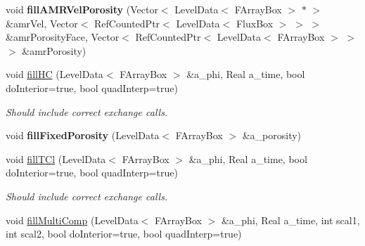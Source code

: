 \begin{DoxyCompactItemize}
\item 
\hypertarget{class_a_m_r_level_mushy_layer_a36ec8a3c5ba9f94da4d1fe0e1e7463cb}{void {\bfseries fill\-A\-M\-R\-Vel\-Porosity} (Vector$<$ Level\-Data$<$ F\-Array\-Box $>$ $\ast$ $>$ \&amr\-Vel, Vector$<$ Ref\-Counted\-Ptr$<$ Level\-Data$<$ Flux\-Box $>$ $>$ $>$ \&amr\-Porosity\-Face, Vector$<$ Ref\-Counted\-Ptr$<$ Level\-Data$<$ F\-Array\-Box $>$ $>$ $>$ \&amr\-Porosity)}\label{class_a_m_r_level_mushy_layer_a36ec8a3c5ba9f94da4d1fe0e1e7463cb}

\item 
\hypertarget{class_a_m_r_level_mushy_layer_aeb42507e6f3613a4ea88070e858b0f48}{void \hyperlink{class_a_m_r_level_mushy_layer_aeb42507e6f3613a4ea88070e858b0f48}{fill\-H\-C} (Level\-Data$<$ F\-Array\-Box $>$ \&a\-\_\-phi, Real a\-\_\-time, bool do\-Interior=true, bool quad\-Interp=true)}\label{class_a_m_r_level_mushy_layer_aeb42507e6f3613a4ea88070e858b0f48}

\begin{DoxyCompactList}\small\item\em Should include correct exchange calls. \end{DoxyCompactList}\item 
\hypertarget{class_a_m_r_level_mushy_layer_a870c44d49909c5c650ea96bc09bff69e}{void {\bfseries fill\-Fixed\-Porosity} (Level\-Data$<$ F\-Array\-Box $>$ \&a\-\_\-porosity)}\label{class_a_m_r_level_mushy_layer_a870c44d49909c5c650ea96bc09bff69e}

\item 
\hypertarget{class_a_m_r_level_mushy_layer_a2b9e24e70db3c56fbf196b0a75dc4640}{void \hyperlink{class_a_m_r_level_mushy_layer_a2b9e24e70db3c56fbf196b0a75dc4640}{fill\-T\-Cl} (Level\-Data$<$ F\-Array\-Box $>$ \&a\-\_\-phi, Real a\-\_\-time, bool do\-Interior=true, bool quad\-Interp=true)}\label{class_a_m_r_level_mushy_layer_a2b9e24e70db3c56fbf196b0a75dc4640}

\begin{DoxyCompactList}\small\item\em Should include correct exchange calls. \end{DoxyCompactList}\item 
\hypertarget{class_a_m_r_level_mushy_layer_ab5c5ff020d63ce90bbae72a367b9ce8f}{void \hyperlink{class_a_m_r_level_mushy_layer_ab5c5ff020d63ce90bbae72a367b9ce8f}{fill\-Multi\-Comp} (Level\-Data$<$ F\-Array\-Box $>$ \&a\-\_\-phi, Real a\-\_\-time, int scal1, int scal2, bool do\-Interior=true, bool quad\-Interp=true)}\label{class_a_m_r_level_mushy_layer_ab5c5ff020d63ce90bbae72a367b9ce8f}


\end{DoxyCompactItemize}
